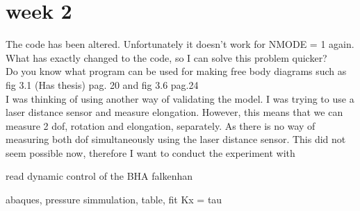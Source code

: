 \section{week 2}


The code has been altered. Unfortunately it doesn't work for NMODE = 1 again. What has exactly changed to the code, so I can solve this problem quicker? \\



Do you know what program can be used for making free body diagrams such as fig 3.1 (Has thesis) pag. 20 and fig 3.6 pag.24\\


I was thinking of using another way of validating the model. I was trying to use a laser distance sensor and measure elongation. However, this means that we can measure 2 dof, rotation and elongation, separately. As there is no way of measuring both dof simultaneously using the laser distance sensor. This did not seem possible now, therefore I want to conduct the experiment with



read dynamic control of the BHA falkenhan



abaques, pressure simmulation, table, fit Kx = tau